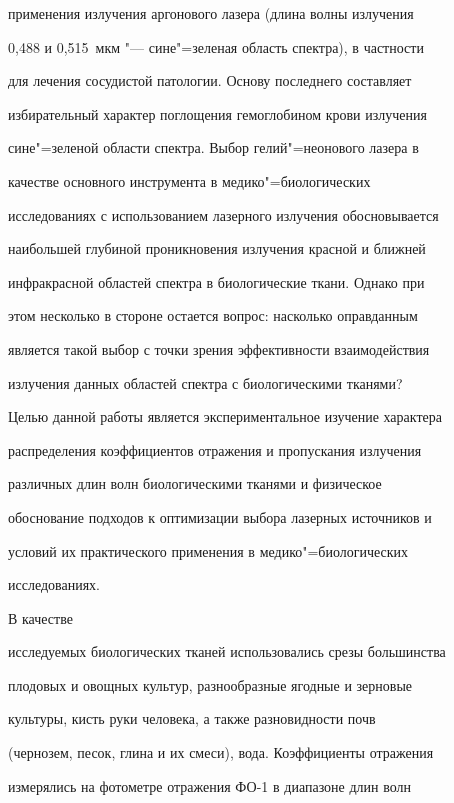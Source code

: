 применения излучения аргонового лазера (длина волны излучения

0,488 и 0,515~мкм "--- сине"=зеленая область спектра), в частности

для лечения сосудистой патологии. Основу последнего составляет

избирательный характер поглощения гемоглобином крови излучения

сине"=зеленой области спектра. Выбор гелий"=неонового лазера в

качестве основного инструмента в медико"=биологических

исследованиях с использованием лазерного излучения обосновывается

наибольшей глубиной проникновения излучения красной и ближней

инфракрасной областей спектра в биологические ткани. Однако при

этом несколько в стороне остается вопрос: насколько оправданным

является такой выбор с точки зрения эффективности взаимодействия

излучения данных областей спектра с биологическими тканями?



Целью данной работы является экспериментальное изучение характера

распределения коэффициентов отражения и пропускания излучения

различных длин волн биологическими тканями и физическое

обоснование подходов к оптимизации выбора лазерных источников и

условий их практического применения в медико"=биологических

исследованиях.



\newpage



 В качестве

исследуемых биологических тканей использовались срезы большинства

плодовых и овощных культур, разнообразные ягодные и зерновые

культуры, кисть руки человека, а также разновидности почв

(чернозем, песок, глина и их смеси), вода. Коэффициенты отражения

измерялись на фотометре отражения ФО-1 в диапазоне длин волн

